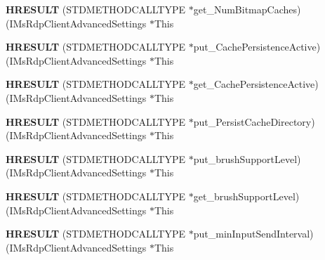 \begin{DoxyCompactItemize}
{\bfseries H\+R\+E\+S\+U\+LT} (S\+T\+D\+M\+E\+T\+H\+O\+D\+C\+A\+L\+L\+T\+Y\+PE $\ast$get\+\_\+\+Num\+Bitmap\+Caches)(I\+Ms\+Rdp\+Client\+Advanced\+Settings $\ast$This
\item 
\mbox{\label{struct_i_ms_rdp_client_advanced_settings_vtbl_a93a67939de13dc6fcefe6a56710f69ac}} 
{\bfseries H\+R\+E\+S\+U\+LT} (S\+T\+D\+M\+E\+T\+H\+O\+D\+C\+A\+L\+L\+T\+Y\+PE $\ast$put\+\_\+\+Cache\+Persistence\+Active)(I\+Ms\+Rdp\+Client\+Advanced\+Settings $\ast$This
\item 
\mbox{\label{struct_i_ms_rdp_client_advanced_settings_vtbl_ac8cf5a6f1cc03d88659d82b8a774b6ad}} 
{\bfseries H\+R\+E\+S\+U\+LT} (S\+T\+D\+M\+E\+T\+H\+O\+D\+C\+A\+L\+L\+T\+Y\+PE $\ast$get\+\_\+\+Cache\+Persistence\+Active)(I\+Ms\+Rdp\+Client\+Advanced\+Settings $\ast$This
\item 
\mbox{\label{struct_i_ms_rdp_client_advanced_settings_vtbl_af525ee52e35a4bcc9908673097be26fa}} 
{\bfseries H\+R\+E\+S\+U\+LT} (S\+T\+D\+M\+E\+T\+H\+O\+D\+C\+A\+L\+L\+T\+Y\+PE $\ast$put\+\_\+\+Persist\+Cache\+Directory)(I\+Ms\+Rdp\+Client\+Advanced\+Settings $\ast$This
\item 
\mbox{\label{struct_i_ms_rdp_client_advanced_settings_vtbl_af69efc0c5f74b73a971e621082eab9b9}} 
{\bfseries H\+R\+E\+S\+U\+LT} (S\+T\+D\+M\+E\+T\+H\+O\+D\+C\+A\+L\+L\+T\+Y\+PE $\ast$put\+\_\+brush\+Support\+Level)(I\+Ms\+Rdp\+Client\+Advanced\+Settings $\ast$This
\item 
\mbox{\label{struct_i_ms_rdp_client_advanced_settings_vtbl_aaa82baa7d9c8a7593049dbb39a45ef1e}} 
{\bfseries H\+R\+E\+S\+U\+LT} (S\+T\+D\+M\+E\+T\+H\+O\+D\+C\+A\+L\+L\+T\+Y\+PE $\ast$get\+\_\+brush\+Support\+Level)(I\+Ms\+Rdp\+Client\+Advanced\+Settings $\ast$This
\item 
\mbox{\label{struct_i_ms_rdp_client_advanced_settings_vtbl_af0a0195aad7e9549ee445b1ef9916e6c}} 
{\bfseries H\+R\+E\+S\+U\+LT} (S\+T\+D\+M\+E\+T\+H\+O\+D\+C\+A\+L\+L\+T\+Y\+PE $\ast$put\+\_\+min\+Input\+Send\+Interval)(I\+Ms\+Rdp\+Client\+Advanced\+Settings $\ast$This

\end{DoxyCompactItemize}
